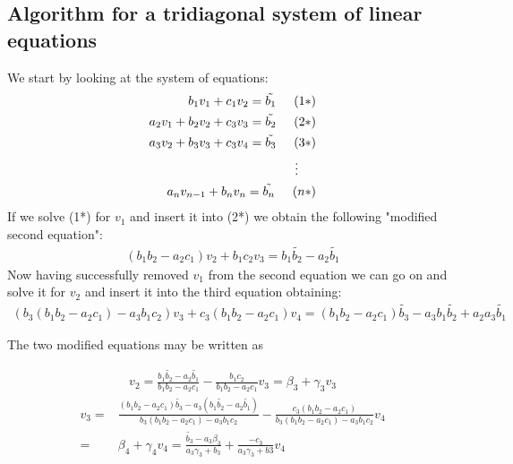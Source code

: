 \documentclass[11pt,a4paper,english]{article}
\begin{document}
\newpage

\subsection*{Algorithm for a tridiagonal system of linear equations}

We start by looking at the system of equations:
\begin{align*}
	 b_1 v_1 + c_1 v_{2} = \tilde{b_1} \hspace{0.5cm} (1*)\\
	 a_2 v_1 + b_2 v_2 + c_3 v_3 = \tilde{b_2} \hspace{0.5cm} (2*) \\
	 a_3 v_2 + b_3 v_3 + c_3 v_4 = \tilde{b_3} \hspace{0.5cm} (3*) \\
	 \vdots \hspace{0.5cm}  \\ 
	 a_n v_{n-1} + b_n v_n = \tilde{b_n} \hspace{0.5cm} (n*)\\
\end{align*}
If we solve (1*) for $v_1$ and insert it into (2*) we obtain the following "modified second equation":
\begin{align*}
	(b_1 b_2 - a_2 c_1)v_2 + b_1 c_2 v_3 = b_1 \tilde{b_2} - a_2  \tilde{b_1}  
\end{align*}
Now having successfully removed $v_1$ from the second equation we can go on and solve it for $v_2$ and insert it into the third equation obtaining:
\begin{align*}
(b_3 (b_1 b_2 - a_2 c_1)- a_3 b_1 c_2)v_3 + c_3(b_1 b_2 -a_2 c_1)v_4 = (b_1 b_2 - a_2 c_1 ) \tilde{b_3} - a_3 b_1 \tilde{b_2} + a_2 a_3 \tilde{b_1} 
\end{align*}

The two modified equations may be written as 

\begin{align*}
v_2 = \frac{b_1 \tilde{b_2} - a_2 \tilde{b_1}}{b_1 b_2 - a_2 c_1} - \frac{b_1 c_2}{b_1 b_2 - a_2 c_1} v_3 = \beta_3 + \gamma_3 v_3
\end{align*}
\begin{align*}
v_3 =& \frac{(b_1 b_2 - a_2 c_1) \tilde{b_3} - a_3 (b_1 \tilde{b_2} - a_2 \tilde{b_1})}{b_3 (b_1 b_2 - a_2 c_1)- a_3 b_1 c_2} - \frac{c_3(b_1 b_2 - a_2 c_1)}{b_3 (b_1 b_2 - a_2 c_1)- a_3 b_1 c_2} v_4 \\
=& \beta_4 + \gamma_4 v_4 = \frac{\tilde{b_3}-a_3 \beta_3}{a_3 \gamma_3 + b_3} + \frac{-c_3}{a_3 \gamma_3 + b3}v_4
\end{align*}
\end{document}
